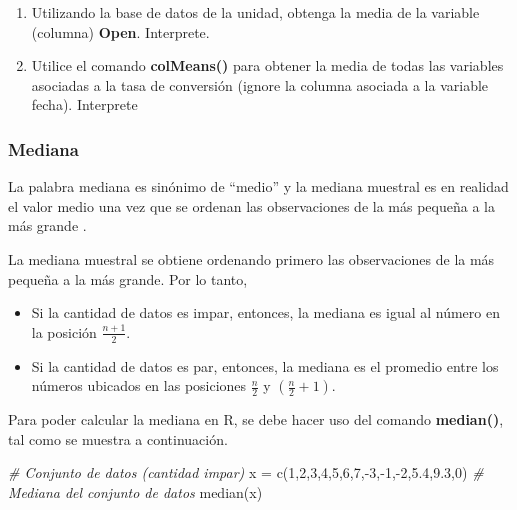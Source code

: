 \documentclass[
]{book}
\newenvironment{Shaded}{\begin{snugshade}}{\end{snugshade}}
\newcommand{\CommentTok}[1]{\textcolor[rgb]{0.56,0.35,0.01}{\textit{#1}}}
\newcommand{\DecValTok}[1]{\textcolor[rgb]{0.00,0.00,0.81}{#1}}
\newcommand{\FloatTok}[1]{\textcolor[rgb]{0.00,0.00,0.81}{#1}}
\newcommand{\FunctionTok}[1]{\textcolor[rgb]{0.00,0.00,0.00}{#1}}
\newcommand{\NormalTok}[1]{#1}
\newcommand{\OtherTok}[1]{\textcolor[rgb]{0.56,0.35,0.01}{#1}}
\newcommand{\SpecialCharTok}[1]{\textcolor[rgb]{0.00,0.00,0.00}{#1}}
\providecommand{\tightlist}{%
  \setlength{\itemsep}{0pt}\setlength{\parskip}{0pt}}
\begin{document}
\begin{enumerate}
\def\labelenumi{\arabic{enumi}.}
\tightlist
\item
  Utilizando la base de datos de la unidad, obtenga la media de la variable (columna) \textbf{Open}. Interprete.
\item
  Utilice el comando \textbf{colMeans()} para obtener la media de todas las variables asociadas a la tasa de conversión (ignore la columna asociada a la variable fecha). Interprete
\end{enumerate}

\hypertarget{mediana}{%
\subsubsection*{Mediana}\label{mediana}}

La palabra mediana es sinónimo de ``medio'' y la mediana muestral es en realidad el valor medio una vez que se ordenan las observaciones de la más pequeña a la más grande \citep[página 26]{Devore}.

La mediana muestral se obtiene ordenando primero las observaciones de la más pequeña a la más grande. Por lo tanto,

\begin{itemize}
\tightlist
\item
  Si la cantidad de datos es impar, entonces, la mediana es igual al número en la posición \(\frac{n+1}{2}\).
\item
  Si la cantidad de datos es par, entonces, la mediana es el promedio entre los números ubicados en las posiciones \(\frac{n}{2}\) y \((\frac{n}{2}+1)\).
\end{itemize}

Para poder calcular la mediana en R, se debe hacer uso del comando \textbf{median()}, tal como se muestra a continuación.

\begin{Shaded}
\begin{Highlighting}[]
\CommentTok{\# Conjunto de datos (cantidad impar)}
\NormalTok{x }\OtherTok{=} \FunctionTok{c}\NormalTok{(}\DecValTok{1}\NormalTok{,}\DecValTok{2}\NormalTok{,}\DecValTok{3}\NormalTok{,}\DecValTok{4}\NormalTok{,}\DecValTok{5}\NormalTok{,}\DecValTok{6}\NormalTok{,}\DecValTok{7}\NormalTok{,}\SpecialCharTok{{-}}\DecValTok{3}\NormalTok{,}\SpecialCharTok{{-}}\DecValTok{1}\NormalTok{,}\SpecialCharTok{{-}}\DecValTok{2}\NormalTok{,}\FloatTok{5.4}\NormalTok{,}\FloatTok{9.3}\NormalTok{,}\DecValTok{0}\NormalTok{)}
\CommentTok{\# Mediana del conjunto de datos}
\FunctionTok{median}\NormalTok{(x)}
\end{Highlighting}
\end{Shaded}
\end{document}
